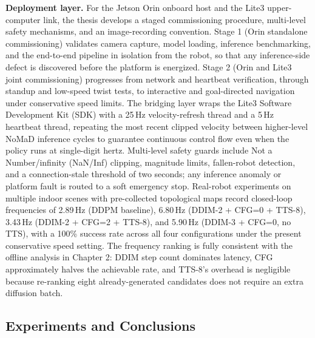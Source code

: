 \begin{digest}[en]
\textbf{Deployment layer.} For the Jetson Orin onboard host and the Lite3
upper-computer link, the thesis develops a staged commissioning procedure, multi-level
safety mechanisms, and an image-recording convention. Stage 1 (Orin standalone
commissioning) validates camera capture, model loading, inference benchmarking, and
the end-to-end pipeline in isolation from the robot, so that any inference-side defect
is discovered before the platform is energized. Stage 2 (Orin and Lite3 joint
commissioning) progresses from network and heartbeat verification, through standup and
low-speed twist tests, to interactive and goal-directed navigation under conservative
speed limits. The bridging layer wraps the Lite3 Software Development Kit (SDK) with a 25\,Hz velocity-refresh
thread and a 5\,Hz heartbeat thread, repeating the most recent clipped velocity
between higher-level NoMaD inference cycles to guarantee continuous control flow even
when the policy runs at single-digit hertz. Multi-level safety guards include
Not a Number/infinity (NaN/Inf) clipping, magnitude limits, fallen-robot detection, and a connection-stale
threshold of two seconds; any inference anomaly or platform fault is routed to a soft
emergency stop. Real-robot experiments on multiple indoor scenes with pre-collected
topological maps record closed-loop frequencies of 2.89\,Hz (DDPM baseline), 6.80\,Hz
(DDIM-2 + CFG=0 + TTS-8), 3.43\,Hz (DDIM-2 + CFG=2 + TTS-8), and 5.90\,Hz
(DDIM-3 + CFG=0, no TTS), with a 100\% success rate across all four configurations
under the present conservative speed setting. The frequency ranking is fully
consistent with the offline analysis in Chapter 2: DDIM step count dominates latency,
CFG approximately halves the achievable rate, and TTS-8's overhead is negligible
because re-ranking eight already-generated candidates does not require an extra
diffusion batch.

\subsection*{Experiments and Conclusions}


\end{digest}
